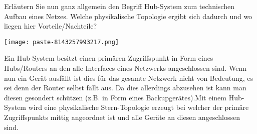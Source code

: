 \documentclass{article}
\begin{document}
\begin{tcolorbox}[colback=white!10!white,colframe=lightgray!75!black,
  savelowerto=\jobname_ex.tex,breakable,enhanced,lines before break=40]

\justifying
Erläutern Sie nun ganz allgemein den Begriff Hub-System zum technischen Aufbau eines Netzes. Welche physikalische Topologie ergibt sich dadurch und wo liegen hier Vorteile/Nachteile?

\tcblower

\justifying
\begin{center}
\texttt{[image: paste-8143257993217.png]}
\end{center}
Ein Hub-System besitzt einen primären Zugriffspunkt in Form eines Hubs/Routers an den alle Interfaces eines Netzwerks angeschlossen sind. Wenn nun ein Gerät ausfällt ist dies für das gesamte Netzwerk nicht von Bedeutung, es sei denn der Router selbst fällt aus. Da dies allerdings abzusehen ist kann man diesen gesondert schützen (z.B. in Form eines Backupgerätes).Mit einem Hub-System wird eine physikalische Stern-Topologie erzeugt bei welcher der primäre Zugriffspunkts mittig angeordnet ist und alle Geräte an diesen angeschlossen sind.
\end{tcolorbox}
\end{document}
